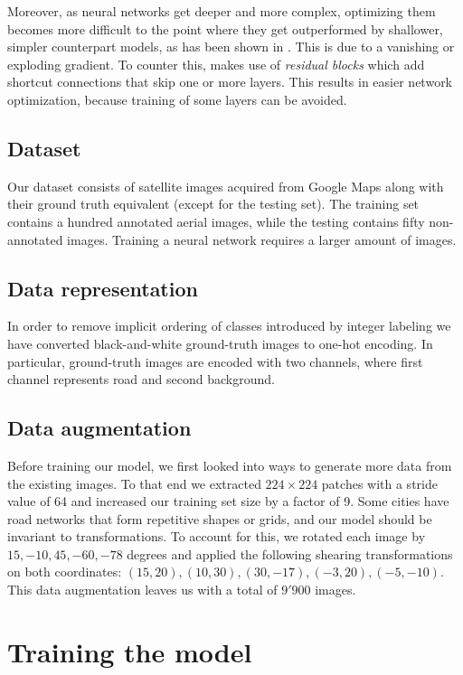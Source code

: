\documentclass[10pt,conference,compsocconf]{IEEEtran}
\begin{document}
Moreover, as neural networks get deeper and more complex, optimizing them becomes more difficult to the point where they get outperformed by shallower, simpler counterpart models, as has been shown in \cite{deep_residual_nn}. This is due to a vanishing or exploding gradient. To counter this, \cite{deep_residual_nn} makes use of \textit{residual blocks} which add shortcut connections that skip one or more layers. This results in easier network optimization, because training of some layers can be avoided.

\subsection{Dataset}

Our dataset consists of satellite images acquired from Google Maps along with their ground truth equivalent (except for the testing set). The training set contains a hundred annotated aerial images, while the testing contains fifty non-annotated images. Training a neural network requires a larger amount of images. 

\subsection{Data representation}

In order to remove implicit ordering of classes introduced by integer labeling we have converted black-and-white ground-truth images to one-hot encoding. In particular, ground-truth images are encoded with two channels, where first channel represents road and second background.

\subsection{Data augmentation}

Before training our model, we first looked into ways to generate more data from the existing images. To that end we extracted $224 \times 224$ patches with a stride value of 64 and increased our training set size by a factor of 9. Some cities have road networks that form repetitive shapes or grids, and our model should be invariant to transformations. To account for this, we rotated each image by $15, -10, 45, -60, -78$ degrees and applied the following shearing transformations on both coordinates: $ (15, 20), (10, 30), (30, -17), (-3, 20), (-5, -10) $. This data augmentation leaves us with a total of $9'900$ images.

\section{Training the model}
\end{document}
